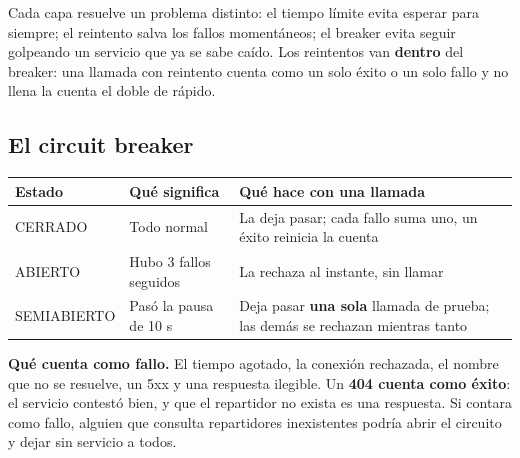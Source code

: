 \documentclass[11pt]{article}
\begin{document}
Cada capa resuelve un problema distinto: el tiempo límite evita esperar para siempre; el reintento
salva los fallos momentáneos; el breaker evita seguir golpeando un servicio que ya se sabe caído. Los
reintentos van \textbf{dentro} del breaker: una llamada con reintento cuenta como un solo éxito o un solo
fallo y no llena la cuenta el doble de rápido.

\subsection{El circuit breaker}

\begin{center}
\end{center}

\begin{tabularx}{\linewidth}{@{}l X X@{}}
\toprule
\textsf{\textbf{Estado}} & \textsf{\textbf{Qué significa}} & \textsf{\textbf{Qué hace con una llamada}} \\
\midrule
CERRADO & Todo normal & La deja pasar; cada fallo suma uno, un éxito reinicia la cuenta \\
ABIERTO & Hubo 3 fallos seguidos & La rechaza al instante, sin llamar \\
SEMIABIERTO & Pasó la pausa de 10 s & Deja pasar \textbf{una sola} llamada de prueba; las demás se rechazan mientras tanto \\
\bottomrule
\end{tabularx}

\textbf{Qué cuenta como fallo.} El tiempo agotado, la conexión rechazada, el nombre que no se resuelve,
un 5xx y una respuesta ilegible. Un \textbf{404 cuenta como éxito}: el servicio contestó bien, y que el
repartidor no exista es una respuesta. Si contara como fallo, alguien que consulta repartidores
inexistentes podría abrir el circuito y dejar sin servicio a todos.
\end{document}
